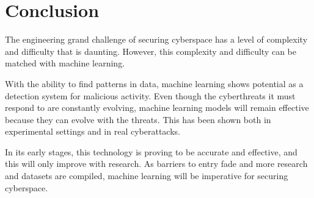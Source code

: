 \section{Conclusion}
The engineering grand challenge of securing cyberspace has a level of complexity and difficulty that is daunting.
However, this complexity and difficulty can be matched with machine learning.

With the ability to find patterns in data, machine learning shows potential as a detection system for malicious activity.
Even though the cyberthreats it must respond to are constantly evolving, machine learning models will remain effective because they can evolve with the threats.
This has been shown both in experimental settings and in real cyberattacks.

In its early stages, this technology is proving to be accurate and effective, and this will only improve with research.
As barriers to entry fade and more research and datasets are compiled, machine learning will be imperative for securing cyberspace.
